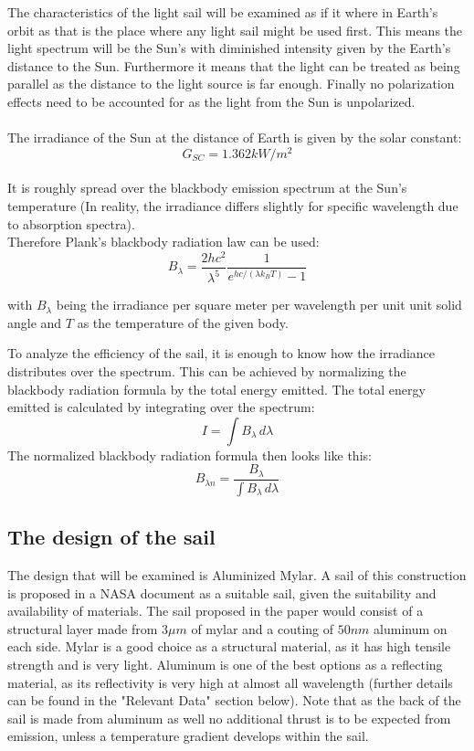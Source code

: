 \documentclass[14pt]{article}
\begin{document}
The characteristics of the light sail will be examined as if it where in Earth's orbit as that is the place where any light sail might be used first.
This means the light spectrum will be the Sun's with diminished intensity given by the Earth's distance to the Sun. Furthermore it means that the light
can be treated as being parallel as the distance to the light source is far enough. Finally no polarization effects need to be accounted for as the 
light from the Sun is unpolarized.\\
\\
The irradiance of the Sun at the distance of Earth is given by the solar constant:
$$
G_{SC} = 1.362 kW/m^2
$$
\\

It is roughly spread over the blackbody emission spectrum at the Sun's 
temperature (In reality, the irradiance differs slightly for specific wavelength due to absorption spectra).\\

Therefore Plank's blackbody radiation law can be used:
$$ 
B_{\lambda} = \frac{2 h c^2}{\lambda^5} \frac{1}{e^{h c / (\lambda k_B T)}-1}
$$

with $B_{\lambda}$ being the irradiance per square meter per wavelength per unit unit solid angle and $T$ as the temperature of the given body.

To analyze the efficiency of the sail, it is enough to know how the irradiance distributes over the spectrum. This can be achieved
by normalizing the blackbody radiation formula by the total energy emitted.
The total energy emitted is calculated by integrating over the spectrum:
$$
I = \int B_{\lambda} \,d \lambda
$$
The normalized blackbody radiation formula then looks like this:
$$
B_{\lambda n} = \frac{B_{\lambda}}{\int B_{\lambda} \,d \lambda}
$$


\subsection{The design of the sail}

The design that will be examined is Aluminized Mylar. A sail of this construction is proposed in a NASA document as a suitable
sail, given the suitability and availability of materials\autocite{hollerman}. The sail proposed in the paper would consist
of a structural layer made from $ 3 \mu m$ of mylar and a couting of $ 50 nm$ aluminum on each side. Mylar is a good choice
as a structural material, as it has high tensile strength and is very light. Aluminum is one of the best options as a
reflecting material, as its reflectivity is very high at almost all wavelength (further details can be found in the "Relevant Data"
section below). Note that as the back of the sail is made from aluminum as well no additional thrust is to be expected from emission, 
unless a temperature gradient develops within the sail.
\end{document}
